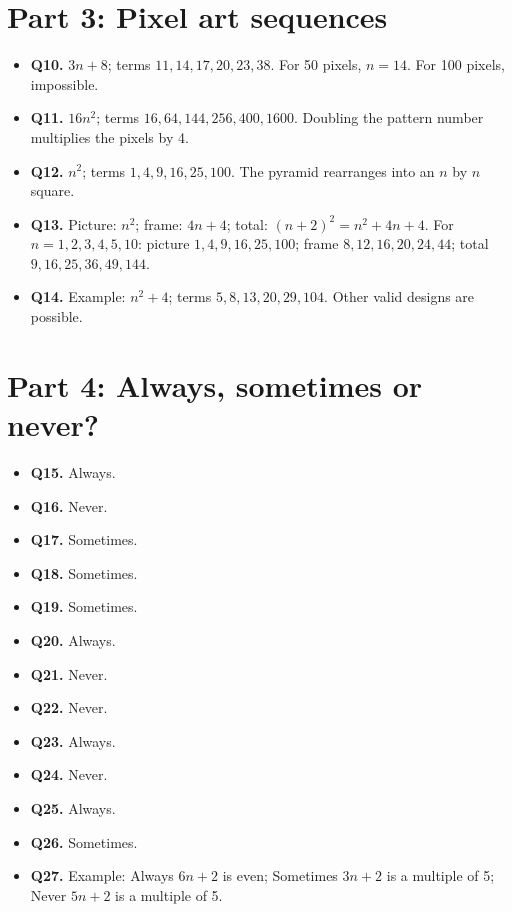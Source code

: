 \documentclass[11pt,a4paper]{article}
\begin{document}
\section*{Part 3: Pixel art sequences}
\begin{itemize}[leftmargin=*,itemsep=3pt]
\item \textbf{Q10.} \(3n+8\); terms \(11,14,17,20,23,38\). For 50 pixels, \(n=14\). For 100 pixels, impossible.
\item \textbf{Q11.} \(16n^2\); terms \(16,64,144,256,400,1600\). Doubling the pattern number multiplies the pixels by 4.
\item \textbf{Q12.} \(n^2\); terms \(1,4,9,16,25,100\). The pyramid rearranges into an \(n\) by \(n\) square.
\item \textbf{Q13.} Picture: \(n^2\); frame: \(4n+4\); total: \((n+2)^2=n^2+4n+4\). For \(n=1,2,3,4,5,10\): picture \(1,4,9,16,25,100\); frame \(8,12,16,20,24,44\); total \(9,16,25,36,49,144\).
\item \textbf{Q14.} Example: \(n^2+4\); terms \(5,8,13,20,29,104\). Other valid designs are possible.
\end{itemize}

\section*{Part 4: Always, sometimes or never?}
\begin{itemize}[leftmargin=*,itemsep=3pt]
\item \textbf{Q15.} Always.
\item \textbf{Q16.} Never.
\item \textbf{Q17.} Sometimes.
\item \textbf{Q18.} Sometimes.
\item \textbf{Q19.} Sometimes.
\item \textbf{Q20.} Always.
\item \textbf{Q21.} Never.
\item \textbf{Q22.} Never.
\item \textbf{Q23.} Always.
\item \textbf{Q24.} Never.
\item \textbf{Q25.} Always.
\item \textbf{Q26.} Sometimes.
\item \textbf{Q27.} Example: Always \(6n+2\) is even; Sometimes \(3n+2\) is a multiple of 5; Never \(5n+2\) is a multiple of 5.
\end{itemize}
\end{document}
